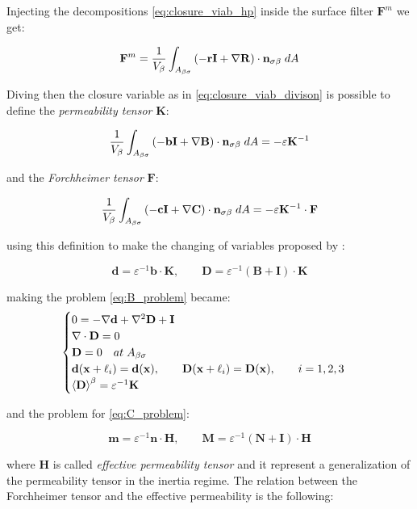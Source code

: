 Injecting the decompositions \ref{eq:closure_viab_hp} inside the surface filter $\mathbf{F}^m$ we get:

$$
\mathbf{F}^m = \dfrac{1}{V_\beta} \int_{A_{\beta \sigma}}  \left(-\mathbf{r}\mathbf{I}  +  \nabla \mathbf{R} \right) \cdot \mathbf{n}_{\sigma \beta} \;dA
$$

Diving then the closure variable as in \ref{eq:closure_viab_divison} is possible to define the \textit{permeability tensor} $\mathbf{K}$:

$$
 \dfrac{1}{V_\beta} \int_{A_{\beta \sigma}}  \left(-\mathbf{b}\mathbf{I}  +  \nabla \mathbf{B} \right) \cdot \mathbf{n}_{\sigma \beta} \;dA = -\varepsilon \mathbf{K}^{-1}
$$

and the \textit{Forchheimer tensor} $\mathbf{F}$:

$$
\dfrac{1}{V_\beta} \int_{A_{\beta \sigma}} \left(-\mathbf{c}\mathbf{I}  +  \nabla \mathbf{C} \right) \cdot \mathbf{n}_{\sigma \beta} \;dA = -\varepsilon \mathbf{K}^{-1} \cdot \mathbf{F}
$$

using this definition to make the changing of variables proposed by \citet{barrere1992closure}:

$$
\mathbf{d} = \varepsilon^{-1} \mathbf{b} \cdot \mathbf{K}, \qquad \mathbf{D} = \varepsilon^{-1} \left(\mathbf{B} + \mathbf{I} \right)\cdot \mathbf{K}
$$

making the problem \eqref{eq:B_problem} became:
\begin{eqnarray}
	\begin{cases}
		0 = -\nabla \mathbf{d} + \nabla^2 \mathbf{D} +\mathbf{I}\\
		\nabla \cdot \mathbf{D} = 0  \\
		\mathbf{D} = 0 \quad at \; A_{\beta \sigma} \\
		\mathbf{d}(\mathbf{x} +\ell_i) = \mathbf{d}(\mathbf{x}), \qquad \mathbf{D}(\mathbf{x} +\ell_i) = \mathbf{D}(\mathbf{x}), \qquad i=1,2,3 \\
		{\left< \mathbf{D} \right>}^{\beta} = \varepsilon^{-1} \mathbf{K}
	\end{cases}
\label{eq:D_problem}
\end{eqnarray}

and the problem for \ref{eq:C_problem}:

$$
\mathbf{m} = \varepsilon^{-1} \mathbf{n} \cdot \mathbf{H}, \qquad \mathbf{M} = \varepsilon^{-1} \left(\mathbf{N} + \mathbf{I} \right)\cdot \mathbf{H}
$$

where $\mathbf{H}$ is called \textit{effective permeability tensor} and it represent a generalization of the permeability tensor in the inertia regime.
The relation between the Forchheimer tensor and the effective permeability is the following:

